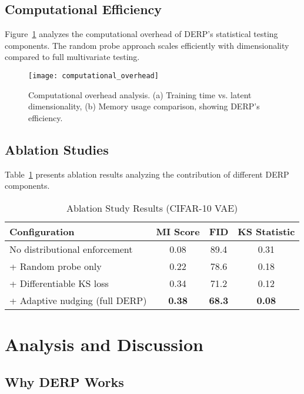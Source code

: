 \documentclass{article}
\begin{document}
\subsection{Computational Efficiency}

Figure~\ref{fig:computational_overhead} analyzes the computational overhead of DERP's statistical testing components. The random probe approach scales efficiently with dimensionality compared to full multivariate testing.

\begin{figure}[t]
\centering
\texttt{[image: computational\_overhead]}
\caption{Computational overhead analysis. (a) Training time vs. latent dimensionality, (b) Memory usage comparison, showing DERP's efficiency.}
\label{fig:computational_overhead}
\end{figure}

\subsection{Ablation Studies}

Table~\ref{tab:ablation} presents ablation results analyzing the contribution of different DERP components.

\begin{table}[t]
\caption{Ablation Study Results (CIFAR-10 VAE)}
\label{tab:ablation}
\centering
\begin{tabular}{lccc}
\toprule
Configuration & MI Score & FID & KS Statistic \\
\midrule
No distributional enforcement & 0.08 & 89.4 & 0.31 \\
+ Random probe only & 0.22 & 78.6 & 0.18 \\
+ Differentiable KS loss & 0.34 & 71.2 & 0.12 \\
+ Adaptive nudging (full DERP) & \textbf{0.38} & \textbf{68.3} & \textbf{0.08} \\
\bottomrule
\end{tabular}
\end{table}

\section{Analysis and Discussion}

\subsection{Why DERP Works}
\end{document}
